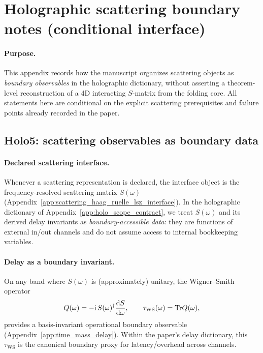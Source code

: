 \section{Holographic scattering boundary notes (conditional interface)}
\label{app:holo_scattering_boundary_notes}

\paragraph{Purpose.}
\AuditTag This appendix records how the manuscript organizes scattering objects as \emph{boundary observables} in the holographic dictionary,
without asserting a theorem-level reconstruction of a 4D interacting $S$-matrix from the folding core.
All statements here are conditional on the explicit scattering prerequisites and failure points already recorded in the paper.

\subsection{Holo5: scattering observables as boundary data}
\label{subsec:holo5_scattering_as_boundary_data}

\paragraph{Declared scattering interface.}
\InterfaceTag Whenever a scattering representation is declared, the interface object is the frequency-resolved scattering matrix $S(\omega)$
(Appendix~\ref{app:scattering_haag_ruelle_lsz_interface}).
In the holographic dictionary of Appendix~\ref{app:holo_scope_contract}, we treat $S(\omega)$ and its derived delay invariants
as \emph{boundary-accessible data}: they are functions of external in/out channels and do not assume access to internal bookkeeping variables.

\paragraph{Delay as a boundary invariant.}
\InterfaceTag On any band where $S(\omega)$ is (approximately) unitary, the Wigner--Smith operator
\[
Q(\omega)=-\mathrm{i}\,S(\omega)^\dagger \frac{\mathrm{d} S}{\mathrm{d} \omega},
\qquad
\tau_{\mathrm{WS}}(\omega)=\mathrm{Tr} Q(\omega),
\]
provides a basis-invariant operational boundary observable (Appendix~\ref{app:time_mass_delay}).
Within the paper's delay dictionary, this $\tau_{\mathrm{WS}}$ is the canonical boundary proxy for latency/overhead across channels.

